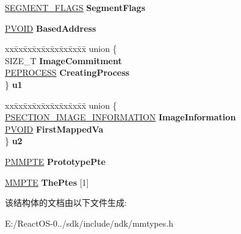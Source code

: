 \begin{DoxyCompactItemize}
\item 
\mbox{\label{struct___s_e_g_m_e_n_t_a84c1f45956497bdce70a53c10f58167f}} 
\hyperlink{struct___s_e_g_m_e_n_t___f_l_a_g_s}{S\+E\+G\+M\+E\+N\+T\+\_\+\+F\+L\+A\+GS} {\bfseries Segment\+Flags}
\item 
\mbox{\label{struct___s_e_g_m_e_n_t_a6168f91b9dea6420a3b821c83c6c4c71}} 
\hyperlink{interfacevoid}{P\+V\+O\+ID} {\bfseries Based\+Address}
\item 
\mbox{\label{struct___s_e_g_m_e_n_t_aabe64a4e85271e45df39f2d9b02a0b4a}} 
\begin{tabbing}
xx\=xx\=xx\=xx\=xx\=xx\=xx\=xx\=xx\=\kill
union \{\\
\>SIZE\_T {\bfseries ImageCommitment}\\
\>\hyperlink{struct___e_p_r_o_c_e_s_s}{PEPROCESS} {\bfseries CreatingProcess}\\
\} {\bfseries u1}\\

\end{tabbing}\item 
\mbox{\label{struct___s_e_g_m_e_n_t_a59b76a13253ab825bdd317d7a700d525}} 
\begin{tabbing}
xx\=xx\=xx\=xx\=xx\=xx\=xx\=xx\=xx\=\kill
union \{\\
\>\hyperlink{struct___s_e_c_t_i_o_n___i_m_a_g_e___i_n_f_o_r_m_a_t_i_o_n}{PSECTION\_IMAGE\_INFORMATION} {\bfseries ImageInformation}\\
\>\hyperlink{interfacevoid}{PVOID} {\bfseries FirstMappedVa}\\
\} {\bfseries u2}\\

\end{tabbing}\item 
\mbox{\label{struct___s_e_g_m_e_n_t_a79dea8e5e020f05a37b67c2448ed804b}} 
\hyperlink{struct___m_m_p_t_e}{P\+M\+M\+P\+TE} {\bfseries Prototype\+Pte}
\item 
\mbox{\label{struct___s_e_g_m_e_n_t_abb2dcc27ba8f1a3af432bfcf22da5368}} 
\hyperlink{struct___m_m_p_t_e}{M\+M\+P\+TE} {\bfseries The\+Ptes} \mbox{[}1\mbox{]}
\end{DoxyCompactItemize}


该结构体的文档由以下文件生成\+:\begin{DoxyCompactItemize}
\item 
E\+:/\+React\+O\+S-\/0../sdk/include/ndk/mmtypes.\+h\end{DoxyCompactItemize}
